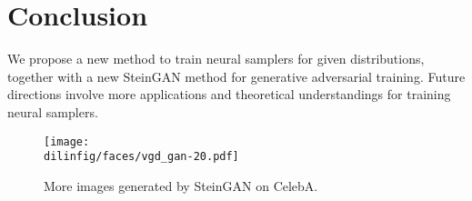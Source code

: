 \documentclass{article} %
\newcommand{\dilinfig}{./figures}
\begin{document}


\section{Conclusion}
We propose a new method to train neural samplers for given distributions, together with a new SteinGAN method for generative adversarial training. 
Future directions involve more applications and theoretical understandings for training neural samplers. 

\newpage\clearpage

{\small

}

\appendix
\begin{figure}[h]
\centering
\texttt{[image: \\dilinfig/faces/vgd\_gan-20.pdf]}  
\caption{More images generated by SteinGAN on CelebA.}
\label{fig:facemore}
\end{figure}
\end{document}
